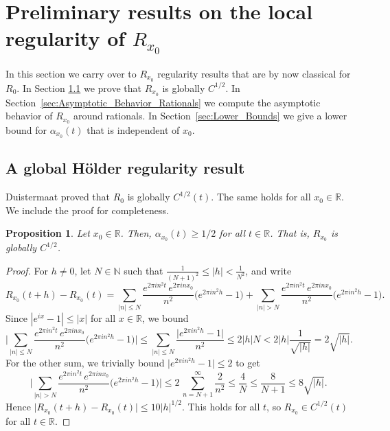 \documentclass[11pt,reqno]{amsart}
\newtheorem{prop}[thm]{Proposition}
\theoremstyle{definition}
\begin{document}
\section{Preliminary results on the local regularity of $R_{x_0}$}
\label{sec:Preliminary_Results}

In this section we carry over to $R_{x_0}$
regularity results that are by now classical for $R_0$. 
In Section \ref{sec:General_Lower_Bound} we prove that
$R_{x_0}$ is globally $C^{1/2}$.
In Section~\ref{sec:Asymptotic_Behavior_Rationals}
we compute the asymptotic behavior of $R_{x_0}$ around rationals. 
In Section~\ref{sec:Lower_Bounds} we give a lower bound for $\alpha_{x_0}(t)$ that is independent of $x_0$. 


\subsection{A global H\"older regularity result}\label{sec:General_Lower_Bound}
Duistermaat \cite[Lemma 4.1.]{Duistermaat1991} proved that $R_0$ is globally $C^{1/2}(t)$. 
The same holds for all $x_0 \in \mathbb R$. 
We include the proof for completeness.
\begin{prop}\label{thm:DuistermaatLowerBound}
Let $x_0 \in \mathbb R$. Then, $\alpha_{x_0}(t) \geq 1/2$ for all $t \in\mathbb R$. That is, $R_{x_0}$ is globally $C^{1/2}$.
\end{prop}
\begin{proof}
For $h \neq 0$, let $N \in \mathbb N$ such that $\frac{1}{(N+1)^2} \leq  |h| < \frac{1}{N^2}  $, 
and write
\begin{equation}
R_{x_0}(t+h) - R_{x_0}(t) 
= \sum_{|n| \leq N} \frac{e^{2\pi i n^2 t}\, e^{2\pi i n x_0} }{n^2} \Big( e^{2\pi i n^2 h} - 1 \Big)
+ \sum_{|n| > N} \frac{e^{2\pi i n^2 t}\, e^{2\pi i n x_0} }{n^2} \Big( e^{2\pi i n^2 h} - 1 \Big).
\end{equation}
Since $|e^{ix} - 1| \leq |x|$ for all $x \in \mathbb R$, we bound
\begin{equation}
\Big| \sum_{|n| \leq N} \frac{e^{2\pi i n^2 t}\, e^{2\pi i n x_0} }{n^2} \Big( e^{2\pi i n^2 h} - 1 \Big) \Big|
\leq  \sum_{|n| \leq N} \frac{ \big| e^{2\pi i n^2 h} - 1 \big|}{n^2}
\leq 2|h|N 
< 2 |h| \frac{1}{\sqrt{|h|}} = 2 \sqrt{|h|}. 
\end{equation}
For the other sum, we trivially bound $\big| e^{2\pi i n^2 h } -  1 \big| \leq 2$ to get
\begin{equation}
\Big|  \sum_{|n| > N} \frac{e^{2\pi i n^2 t}\, e^{2\pi i n x_0} }{n^2} \Big( e^{2\pi i n^2 h} - 1 \Big)  \Big|
\leq  2\, \sum_{n=N+1}^\infty \frac{2}{n^2} 
\leq \frac{4}{N} 
\leq \frac{8}{N+1}
\leq 8 \sqrt{|h|}. 
\end{equation}
Hence $\big| R_{x_0}(t+h) - R_{x_0}(t) \big| \leq 10  |h|^{1/2}$. 
This holds for all $t$, so $R_{x_0} \in C^{1/2}(t)$ for all $t \in \mathbb R$. 
\end{proof}
\end{document}

